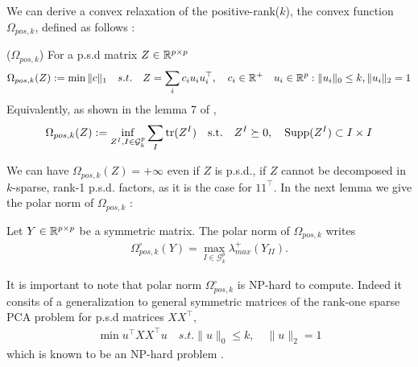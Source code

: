We can derive a convex relaxation of the positive-rank($k$), the convex function $\Omega_{pos,k}$, defined as follows :
\begin{mydef}
($\Omega_{pos,k}$) For a p.s.d  matrix $Z\in\mathbb{R}^{p\times p}$ 
\begin{align}
\Omega_{pos,k}(Z):=\min \|c\|_1 \quad s.t. \quad Z=\sum_{i} c_i u_i u_{i}^\top, \quad c_i\in \mathbb{R}^{+} \quad u_{i}\in\mathbb{R}^p  :   \|u_{i}\|_0 \leq k, \|u_{i}\|_2 = 1
\end{align}
Equivalently, as shown in the lemma 7 of \citet{richard2014tight},
\begin{align}
\Omega_{pos,k}(Z):=\inf_{Z^I, I\in\mathcal{G}^p_k} \sum_{I}{\rm tr}(Z^I) \quad \text{s.t.} \quad Z^I\succeq 0 ,\quad{\rm Supp}(Z^I)\subset I\times I
\end{align}
\end{mydef}

We can have $\Omega_{pos,k}(Z)=+\infty$ even if $Z$ is p.s.d., if $Z$ cannot be decomposed in $k$-sparse,  rank-1 p.s.d. factors, as it is the case for $11^{\top}$. In the next lemma we give the polar norm of $\Omega_{pos,k}$ :

\begin{lemm}
\label{lem:LMO}
Let $Y\in\mathbb{R}^{p\times p}$ be a symmetric matrix. The polar norm of $\Omega_{pos,k}$ writes
\begin{align}
{\Omega_{pos,k}^{\circ}}(Y)= \max_{I\in\mathcal{G}^p_k}\lambda^{+}_{max}(Y_{II}).
\end{align}
\end{lemm}

It is important to note that polar norm $\Omega_{pos,k}^{\circ}$ is NP-hard to compute. Indeed it consits of a generalization to general symmetric matrices of the rank-one sparse PCA problem for p.s.d matrices $XX^{\top}$,
\begin{align*}
\min u^{\top}XX^{\top}u \quad s.t.  \|u\|_0 \leq k,\quad \|u\|_2 = 1
\end{align*}
which is known to be an NP-hard problem \citep{moghaddam2008sparse}.



